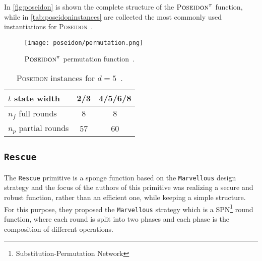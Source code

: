 \documentclass[12pt, a4paper]{report}
\begin{document}
In \autoref{fig:poseidon} is shown the complete structure of the $\textsc{Poseidon}^\pi$ function, while in \autoref{tab:poseidoninstances} are collected the most commonly used instantiations for \textsc{Poseidon}~\cite[Tab.2]{poseidon}.

\begin{figure}[H]
  \begin{center}
      \texttt{[image: poseidon/permutation.png]}
  \end{center}
  \caption{$\textsc{Poseidon}^\pi$ permutation function~\cite[Fig.~2]{poseidon}.}\label{fig:poseidon}
\end{figure}

\begin{table}[H]
  \caption{\textsc{Poseidon} instances for $d=5$~\cite[Tab.~2]{poseidon}.}\label{tab:poseidoninstances}
  \begin{center}
    \begin{tabular}{|l|c|c|}
      \hline
      $t$ state width & 2/3 & 4/5/6/8 \\
      \hline
      $n_f$ full rounds & 8 & 8 \\
      \hline
      $n_p$ partial rounds & 57 & 60 \\
      \hline
    \end{tabular}
  \end{center}
\end{table}

\subsection{\texttt{Rescue}}\label{subsec:rescue}

The \texttt{Rescue} primitive is a sponge function based on the \texttt{Marvellous} design strategy and the focus of the authors of this primitive was realizing a secure and robust function, rather than an efficient one, while keeping a simple structure.
For this purpose, they proposed the \texttt{Marvellous} strategy which is a SPN\footnote{Substitution-Permutation Network} round function, where each round is split into two phases and each phase is the composition of different operations.
\end{document}
